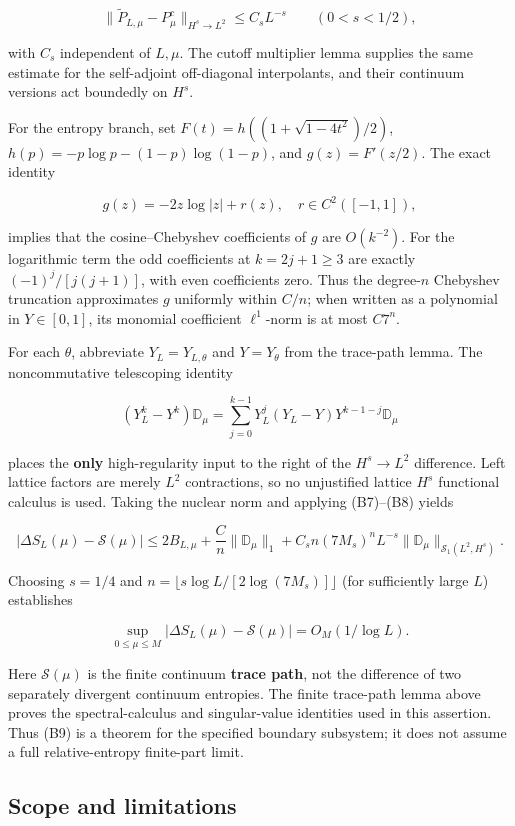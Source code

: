 \documentclass[
  10pt,
  a4paper,
]{article}
\begin{document}
\[
\boxed{\|\widetilde P_{L,\mu}-P_\mu^c\|_{H^s\to L^2}\le C_sL^{-s}}
\qquad (0<s<1/2),\tag{B8}
\]

with \(C_s\) independent of \(L,\mu\). The cutoff multiplier lemma supplies the same estimate for the self-adjoint off-diagonal interpolants, and their continuum versions act boundedly on \(H^s\).

For the entropy branch, set \(F(t)=h((1+\sqrt{1-4t^2})/2)\), \(h(p)=-p\log p-(1-p)\log(1-p)\), and \(g(z)=F'(z/2)\). The exact identity

\[
g(z)=-2z\log|z|+r(z),\quad r\in C^2([-1,1]),
\]

implies that the cosine--Chebyshev coefficients of \(g\) are \(O(k^{-2})\). For the logarithmic term the odd coefficients at \(k=2j+1\ge3\) are exactly \((-1)^j/[j(j+1)]\), with even coefficients zero. Thus the degree-\(n\) Chebyshev truncation approximates \(g\) uniformly within \(C/n\); when written as a polynomial in \(Y\in[0,1]\), its monomial coefficient \(\ell^1\)-norm is at most \(C7^n\).

For each \(\theta\), abbreviate \(Y_L=Y_{L,\theta}\) and \(Y=Y_\theta\) from the trace-path lemma. The noncommutative telescoping identity

\[
(Y_L^k-Y^k)\mathbb D_\mu
=\sum_{j=0}^{k-1}Y_L^j(Y_L-Y)Y^{k-1-j}\mathbb D_\mu
\]

places the \textbf{only} high-regularity input to the right of the \(H^s\to L^2\) difference. Left lattice factors are merely \(L^2\) contractions, so no unjustified lattice \(H^s\) functional calculus is used. Taking the nuclear norm and applying (B7)--(B8) yields

\[
|\Delta S_L(\mu)-\mathcal S(\mu)|
\le 2B_{L,\mu}+\frac Cn\|\mathbb D_\mu\|_1
+C_s n(7M_s)^n L^{-s}\|\mathbb D_\mu\|_{\mathcal S_1(L^2,H^s)}.
\]

Choosing \(s=1/4\) and \(n=\lfloor s\log L/[2\log(7M_s)]\rfloor\) (for sufficiently large \(L\)) establishes

\[
\boxed{\sup_{0\le\mu\le M}|\Delta S_L(\mu)-\mathcal S(\mu)|=O_M(1/\log L)}.
\tag{B9}
\]

Here \(\mathcal S(\mu)\) is the finite continuum \textbf{trace path}, not the difference of two separately divergent continuum entropies. The finite trace-path lemma above proves the spectral-calculus and singular-value identities used in this assertion. Thus (B9) is a theorem for the specified boundary subsystem; it does not assume a full relative-entropy finite-part limit.

\subsection{Scope and limitations}\label{scope-and-limitations}
\end{document}
